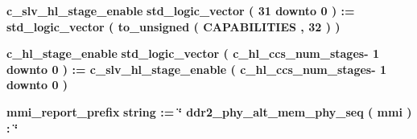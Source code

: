 \begin{DoxyCompactItemize}
\item 
{\bf c\+\_\+slv\+\_\+hl\+\_\+stage\+\_\+enable} {\bfseries \textcolor{comment}{std\+\_\+logic\+\_\+vector}\textcolor{vhdlchar}{ }\textcolor{vhdlchar}{(}\textcolor{vhdlchar}{ }\textcolor{vhdlchar}{ } \textcolor{vhdldigit}{31} \textcolor{vhdlchar}{ }\textcolor{keywordflow}{downto}\textcolor{vhdlchar}{ }\textcolor{vhdlchar}{ } \textcolor{vhdldigit}{0} \textcolor{vhdlchar}{ }\textcolor{vhdlchar}{)}\textcolor{vhdlchar}{ }\textcolor{vhdlchar}{ }\textcolor{vhdlchar}{ }\textcolor{vhdlchar}{\+:}\textcolor{vhdlchar}{=}\textcolor{vhdlchar}{ }\textcolor{vhdlchar}{ }\textcolor{vhdlchar}{ }\textcolor{vhdlchar}{ }\textcolor{comment}{std\+\_\+logic\+\_\+vector}\textcolor{vhdlchar}{ }\textcolor{vhdlchar}{(}\textcolor{vhdlchar}{ }\textcolor{vhdlchar}{to\+\_\+unsigned}\textcolor{vhdlchar}{ }\textcolor{vhdlchar}{(}\textcolor{vhdlchar}{ }\textcolor{vhdlchar}{ }\textcolor{vhdlchar}{ }\textcolor{vhdlchar}{ }{\bfseries {\bf C\+A\+P\+A\+B\+I\+L\+I\+T\+I\+ES}} \textcolor{vhdlchar}{ }\textcolor{vhdlchar}{,}\textcolor{vhdlchar}{ }\textcolor{vhdlchar}{ } \textcolor{vhdldigit}{32} \textcolor{vhdlchar}{ }\textcolor{vhdlchar}{)}\textcolor{vhdlchar}{ }\textcolor{vhdlchar}{ }\textcolor{vhdlchar}{ }\textcolor{vhdlchar}{)}\textcolor{vhdlchar}{ }} 
\item 
{\bf c\+\_\+hl\+\_\+stage\+\_\+enable} {\bfseries \textcolor{comment}{std\+\_\+logic\+\_\+vector}\textcolor{vhdlchar}{ }\textcolor{vhdlchar}{(}\textcolor{vhdlchar}{ }\textcolor{vhdlchar}{ }\textcolor{vhdlchar}{ }\textcolor{vhdlchar}{ }\textcolor{vhdlchar}{c\+\_\+hl\+\_\+ccs\+\_\+num\+\_\+stages}\textcolor{vhdlchar}{-\/}\textcolor{vhdlchar}{ } \textcolor{vhdldigit}{1} \textcolor{vhdlchar}{ }\textcolor{keywordflow}{downto}\textcolor{vhdlchar}{ }\textcolor{vhdlchar}{ } \textcolor{vhdldigit}{0} \textcolor{vhdlchar}{ }\textcolor{vhdlchar}{)}\textcolor{vhdlchar}{ }\textcolor{vhdlchar}{ }\textcolor{vhdlchar}{ }\textcolor{vhdlchar}{\+:}\textcolor{vhdlchar}{=}\textcolor{vhdlchar}{ }\textcolor{vhdlchar}{ }\textcolor{vhdlchar}{ }\textcolor{vhdlchar}{ }{\bfseries {\bf c\+\_\+slv\+\_\+hl\+\_\+stage\+\_\+enable}} \textcolor{vhdlchar}{ }\textcolor{vhdlchar}{(}\textcolor{vhdlchar}{ }\textcolor{vhdlchar}{ }\textcolor{vhdlchar}{ }\textcolor{vhdlchar}{ }\textcolor{vhdlchar}{c\+\_\+hl\+\_\+ccs\+\_\+num\+\_\+stages}\textcolor{vhdlchar}{-\/}\textcolor{vhdlchar}{ } \textcolor{vhdldigit}{1} \textcolor{vhdlchar}{ }\textcolor{keywordflow}{downto}\textcolor{vhdlchar}{ }\textcolor{vhdlchar}{ } \textcolor{vhdldigit}{0} \textcolor{vhdlchar}{ }\textcolor{vhdlchar}{)}\textcolor{vhdlchar}{ }} 
\item 
{\bf mmi\+\_\+report\+\_\+prefix} {\bfseries \textcolor{comment}{string}\textcolor{vhdlchar}{ }\textcolor{vhdlchar}{ }\textcolor{vhdlchar}{\+:}\textcolor{vhdlchar}{=}\textcolor{vhdlchar}{ }\textcolor{vhdlchar}{ }\textcolor{vhdlchar}{ }\textcolor{vhdlchar}{ }\textcolor{keyword}{\char`\"{} ddr2\+\_\+phy\+\_\+alt\+\_\+mem\+\_\+phy\+\_\+seq ( mmi )  \+:  \char`\"{}}\textcolor{vhdlchar}{ }} 
\end{DoxyCompactItemize}
